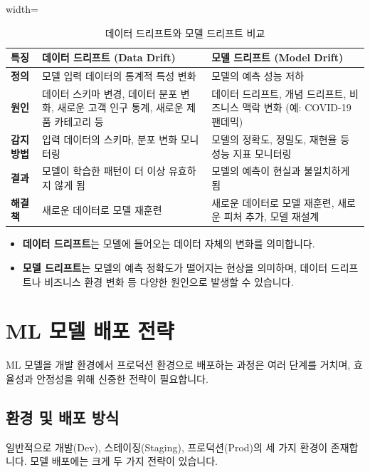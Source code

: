 \documentclass[11pt,a4paper]{article}
\theoremstyle{definition}
\begin{document}
\begin{table}[h!]
\caption{데이터 드리프트와 모델 드리프트 비교}
\label{tab:drift_comparison}
\centering
\begin{adjustbox}{width=\textwidth}
\begin{tabular}{lll}
\toprule
\textbf{특징} & \textbf{데이터 드리프트 (Data Drift)} & \textbf{모델 드리프트 (Model Drift)} \\
\midrule
\textbf{정의} & 모델 입력 데이터의 통계적 특성 변화 & 모델의 예측 성능 저하 \\
\textbf{원인} & 데이터 스키마 변경, 데이터 분포 변화, 새로운 고객 인구 통계, 새로운 제품 카테고리 등 & 데이터 드리프트, 개념 드리프트, 비즈니스 맥락 변화 (예: COVID-19 팬데믹) \\
\textbf{감지 방법} & 입력 데이터의 스키마, 분포 변화 모니터링 & 모델의 정확도, 정밀도, 재현율 등 성능 지표 모니터링 \\
\textbf{결과} & 모델이 학습한 패턴이 더 이상 유효하지 않게 됨 & 모델의 예측이 현실과 불일치하게 됨 \\
\textbf{해결책} & 새로운 데이터로 모델 재훈련 & 새로운 데이터로 모델 재훈련, 새로운 피처 추가, 모델 재설계 \\
\bottomrule
\end{tabular}
\end{adjustbox}
\vspace{1em}
\begin{itemize}
    \item \textbf{데이터 드리프트}는 모델에 들어오는 데이터 자체의 변화를 의미합니다.
    \item \textbf{모델 드리프트}는 모델의 예측 정확도가 떨어지는 현상을 의미하며, 데이터 드리프트나 비즈니스 환경 변화 등 다양한 원인으로 발생할 수 있습니다.
\end{itemize}
\end{table}

\newpage
\section{ML 모델 배포 전략}

ML 모델을 개발 환경에서 프로덕션 환경으로 배포하는 과정은 여러 단계를 거치며, 효율성과 안정성을 위해 신중한 전략이 필요합니다.

\subsection{환경 및 배포 방식}

일반적으로 개발(Dev), 스테이징(Staging), 프로덕션(Prod)의 세 가지 환경이 존재합니다. 모델 배포에는 크게 두 가지 전략이 있습니다.
\end{document}
